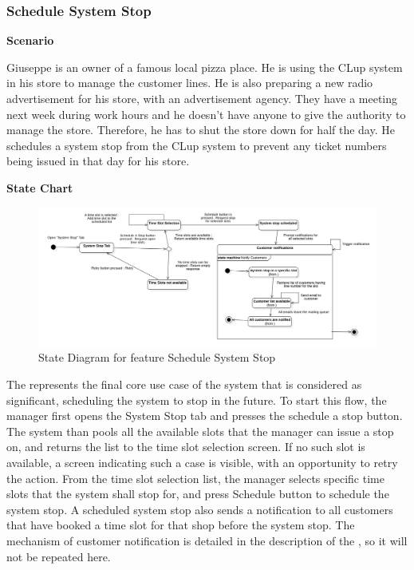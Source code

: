 \subsubsection{Schedule System Stop}

\textbf{Scenario}

Giuseppe is an owner of a famous local pizza place.
He is using the CLup system in his store to manage the customer lines.
He is also preparing a new radio advertisement for his store, with an advertisement agency.
They have a meeting next week during work hours and he doesn't have anyone to give the authority to manage the store.
Therefore, he has to shut the store down for half the day.
He schedules a system stop from the CLup system to prevent any ticket numbers being issued in that day for his store.

\textbf{State Chart}

\begin{figure}[H]
    \centering
    \includegraphics[height=0.4\textwidth]{Images/StateCharts/ScheduleSystemStop.png}
    \caption{State Diagram for feature Schedule System Stop}
    \label{fig:SDScheduleStop}
\end{figure}

The  represents the final core use case of the system that is considered as significant, scheduling the system to stop in the future.
To start this flow, the manager first opens the System Stop tab and presses the schedule a stop button.
The system than pools all the available slots that the manager can issue a stop on, and returns the list to the time slot selection screen.
If no such slot is available, a screen indicating such a case is visible, with an opportunity to retry the action.
From the time slot selection list, the manager selects specific time slots that the system shall stop for, and press Schedule button to schedule the system stop.
A scheduled system stop also sends a notification to all customers that have booked a time slot for that shop before the system stop.
The mechanism of customer notification is detailed in the description of the , so it will not be repeated here.


